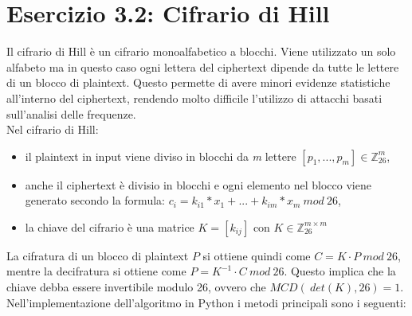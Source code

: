 \documentclass{article}
\begin{document}
\section*{Esercizio 3.2: Cifrario di Hill}
Il cifrario di Hill è un cifrario monoalfabetico a blocchi. Viene utilizzato un solo alfabeto ma in questo caso ogni lettera del ciphertext dipende da tutte le lettere di un blocco di plaintext. Questo permette di avere minori evidenze statistiche all'interno del ciphertext, rendendo molto difficile l'utilizzo di attacchi basati sull'analisi delle frequenze.\\
Nel cifrario di Hill:
\begin{itemize}
    \item il plaintext in input viene diviso in blocchi da \textit{m} lettere $[p_1,..., p_m] \in \mathbb{Z}^m_{26}$, 
    \item anche il ciphertext è divisio in blocchi e ogni elemento nel blocco viene generato secondo la formula: $c_i = k_{i1}*x_1 + ... + k_{im}*x_m \: mod \: 26$,
    \item la chiave del cifrario è una matrice $K = [k_{ij}]$ con $K \in \mathbb{Z}^{m \times m}_{26}$
\end{itemize}
La cifratura di un blocco di plaintext $P$ si ottiene quindi come $C = K \cdot P \: mod \: 26$, mentre la decifratura si ottiene come $P = K^{-1} \cdot C \: mod \: 26$. Questo implica che la chiave debba essere invertibile modulo 26, ovvero che $MCD(\: det(K),26) = 1$.\\ 
Nell'implementazione dell'algoritmo in Python i metodi principali sono i seguenti:
\end{document}
